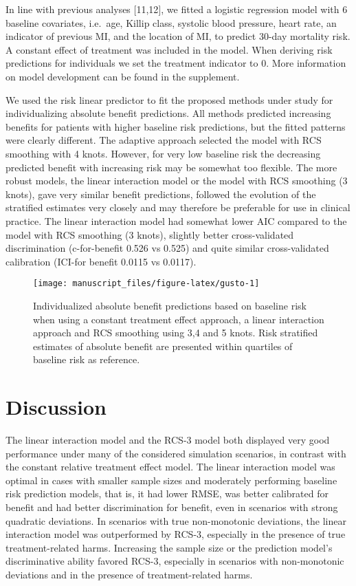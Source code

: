 \documentclass[]{elsarticle} %
\begin{document}
In line with previous analyses {[}11,12{]}, we fitted a logistic
regression model with 6 baseline covariates, i.e.~age, Killip class,
systolic blood pressure, heart rate, an indicator of previous MI, and
the location of MI, to predict 30-day mortality risk. A constant effect
of treatment was included in the model. When deriving risk predictions
for individuals we set the treatment indicator to 0. More information on
model development can be found in the supplement.

We used the risk linear predictor to fit the proposed methods under
study for individualizing absolute benefit predictions. All methods
predicted increasing benefits for patients with higher baseline risk
predictions, but the fitted patterns were clearly different. The
adaptive approach selected the model with RCS smoothing with 4 knots.
However, for very low baseline risk the decreasing predicted benefit
with increasing risk may be somewhat too flexible. The more robust
models, the linear interaction model or the model with RCS smoothing (3
knots), gave very similar benefit predictions, followed the evolution of
the stratified estimates very closely and may therefore be preferable
for use in clinical practice. The linear interaction model had somewhat
lower AIC compared to the model with RCS smoothing (3 knots), slightly
better cross-validated discrimination (c-for-benefit 0.526 vs 0.525) and
quite similar cross-validated calibration (ICI-for benefit 0.0115 vs
0.0117).

\begin{figure}
\texttt{[image: manuscript\_files/figure-latex/gusto-1]} \caption{Individualized absolute benefit predictions based on baseline risk when using a constant treatment effect approach, a linear interaction approach and RCS smoothing using 3,4 and 5 knots. Risk stratified estimates of absolute benefit are presented within quartiles of baseline risk as reference.}\label{fig:gusto}
\end{figure}

\hypertarget{discussion}{%
\section{Discussion}\label{discussion}}

The linear interaction model and the RCS-3 model both displayed very
good performance under many of the considered simulation scenarios, in
contrast with the constant relative treatment effect model. The linear
interaction model was optimal in cases with smaller sample sizes and
moderately performing baseline risk prediction models, that is, it had
lower RMSE, was better calibrated for benefit and had better
discrimination for benefit, even in scenarios with strong quadratic
deviations. In scenarios with true non-monotonic deviations, the linear
interaction model was outperformed by RCS-3, especially in the presence
of true treatment-related harms. Increasing the sample size or the
prediction model's discriminative ability favored RCS-3, especially in
scenarios with non-monotonic deviations and in the presence of
treatment-related harms.
\end{document}
